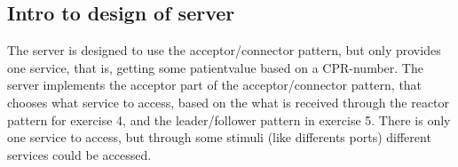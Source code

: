 \documentclass[Main]{subfiles}
\begin{document}
\subsection{Intro to design of server}
The server is designed to use the acceptor/connector pattern, but only provides one service, that is, getting some patientvalue based on a CPR-number.
The server implements the acceptor part of the acceptor/connector pattern, that chooses what service to access, based on the what is received through the reactor pattern for exercise 4, and the leader/follower pattern in exercise 5. 
There is only one service to access, but through some stimuli (like differents ports) different services could be accessed.
\end{document}

